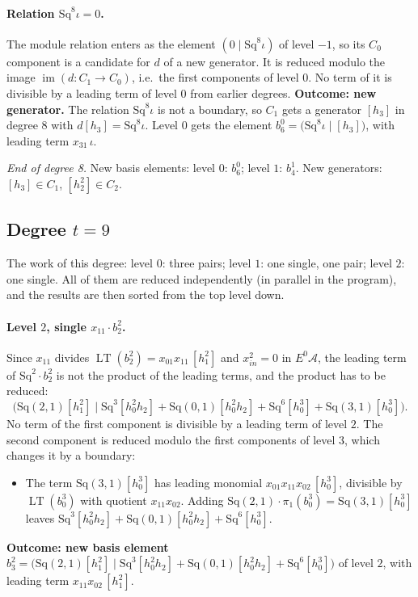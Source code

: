 \documentclass[11pt]{article}
\newcommand{\Sq}{\mathrm{Sq}}
\newcommand{\A}{\mathcal{A}}
\DeclareMathOperator{\LT}{LT}
\begin{document}
\paragraph{Relation $\Sq^{8}\iota = 0$.} The module relation enters as the element $(0 \mid \Sq^{8}\iota)$ of level $-1$, so its $C_0$ component is a candidate for $d$ of a new generator. It is reduced modulo the image $\operatorname{im}(d\colon C_1\to C_0)$, i.e.\ the first components of level $0$.
No term of it is divisible by a leading term of level $0$ from earlier degrees.
\textbf{Outcome: new generator.} The relation $\Sq^{8}\iota$ is not a boundary, so $C_{1}$ gets a generator $[h_3]$ in degree $8$ with $d[h_3] = \Sq^{8}\iota$.
Level $0$ gets the element $b^{0}_{6} = \bigl(\Sq^{8}\iota \;\big|\; [h_3]\bigr)$, with leading term $x_{31}\,\iota$.
\medskip
\par\noindent\emph{End of degree 8.} New basis elements: level $0$: $b^{0}_{6}$; level $1$: $b^{1}_{4}$. New generators: $[h_3]\in C_{1}$, $[h_2^2]\in C_{2}$.
\subsection*{Degree $t = 9$}
\noindent The work of this degree: level $0$: three pairs; level $1$: one single, one pair; level $2$: one single. All of them are reduced independently (in parallel in the program), and the results are then sorted from the top level down.
\medskip
\paragraph{Level $2$, single $x_{11}\cdot b^{2}_{2}$.} Since $x_{11}$ divides $\LT(b^{2}_{2}) = x_{01}x_{11}\,[h_1^2]$ and $x_{in}^2 = 0$ in $E^0\A$, the leading term of $\Sq^{2}\cdot b^{2}_{2}$ is not the product of the leading terms, and the product has to be reduced:
\[\bigl(\Sq(2,1)[h_1^2] \;\big|\; \Sq^{3}[h_0^2h_2] + \Sq(0,1)[h_0^2h_2] + \Sq^{6}[h_0^3] + \Sq(3,1)[h_0^3]\bigr).\]
No term of the first component is divisible by a leading term of level $2$.
The second component is reduced modulo the first components of level $3$, which changes it by a boundary:
\begin{itemize}
\item The term $\Sq(3,1)[h_0^3]$ has leading monomial $x_{01}x_{11}x_{02}\,[h_0^3]$, divisible by $\LT(b^{3}_{0})$ with quotient $x_{11}x_{02}$. Adding $\Sq(2,1)\cdot \pi_1(b^{3}_{0}) = \Sq(3,1)[h_0^3]$ leaves $\Sq^{3}[h_0^2h_2] + \Sq(0,1)[h_0^2h_2] + \Sq^{6}[h_0^3]$.
\end{itemize}
\textbf{Outcome: new basis element} $b^{2}_{3} = \bigl(\Sq(2,1)[h_1^2] \;\big|\; \Sq^{3}[h_0^2h_2] + \Sq(0,1)[h_0^2h_2] + \Sq^{6}[h_0^3]\bigr)$ of level $2$, with leading term $x_{11}x_{02}\,[h_1^2]$.
\medskip
\end{document}
